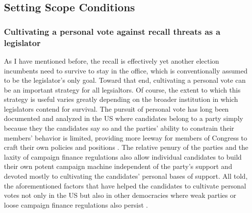 \documentclass[hyphens, crop=false]{standalone}
\begin{document}
		\subsection*{Setting Scope Conditions}
		\subsubsection*{Cultivating a personal vote against recall threats as a legislator}
		
		
		As I have mentioned before,
		the recall is effectively yet another election incumbents need to survive to stay in the office,
		which is conventionally assumed to be the legislator's only goal.
		Toward that end,
		cultivating a personal vote can be an important strategy for all legsialtors.
		Of course,
		the extent to which this strategy is useful varies greatly depending on the broader institution in which legislators contend for survival.
		The pursuit of personal vote has long been documented and analyzed in the US where candidates belong to a party simply because they the candidates say so and the parties' ability to constrain their members' behavior is limited,
		providing more leeway for members of Congress to craft their own policies and positions
		\autocite{mayhewCongressElectoralConnection1974, coxLegislativeLeviathanParty2007, cainPersonalVoteConstituency1987}.
		The relative penury of the parties and the laxity of campaign finance regulations also allow individual candidates to build their own potent campaign machine independent of the party's support and devoted mostly to cultivating the candidates' personal bases of support.
		All told,
		the aforementioned factors that have helped the candidates to cultivate personal votes not only in the US but also in other democracies where weak parties or loose campaign finance regulations also persist
		\autocite{careyLegislativeVotingAccountability2008,crispCapturingVoteseekingIncentives2021,reedDemocracyPersonalVote1994}.
		
\end{document}
